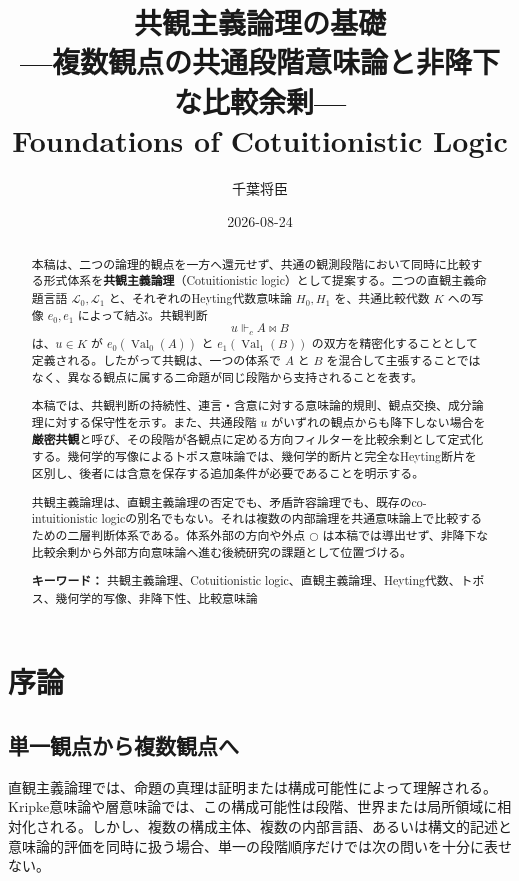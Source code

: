 \documentclass[a4paper,11pt]{ltjsarticle}
\title{共観主義論理の基礎\\[0.2em]
  {\Large ---複数観点の共通段階意味論と非降下な比較余剰---}\\[0.4em]
  {\large Foundations of Cotuitionistic Logic}}
\author{千葉将臣}
\date{2026-08-24}
\theoremstyle{definition}
\theoremstyle{plain}
\newcommand{\Val}{\operatorname{Val}}
\newcommand{\dfix}{\bigcirc}
\newcommand{\forcesc}{\Vdash_{\!c}}
\begin{document}
\maketitle

\begin{abstract}
本稿は、二つの論理的観点を一方へ還元せず、共通の観測段階において同時に比較する形式体系を\textbf{共観主義論理}（Cotuitionistic logic）として提案する。二つの直観主義命題言語 $\mathcal L_0,\mathcal L_1$ と、それぞれのHeyting代数意味論 $H_0,H_1$ を、共通比較代数 $K$ への写像 $e_0,e_1$ によって結ぶ。共観判断
\[
 u\forcesc A\bowtie B
\]
は、$u\in K$ が $e_0(\Val_0(A))$ と $e_1(\Val_1(B))$ の双方を精密化することとして定義される。したがって共観は、一つの体系で $A$ と $B$ を混合して主張することではなく、異なる観点に属する二命題が同じ段階から支持されることを表す。

本稿では、共観判断の持続性、連言・含意に対する意味論的規則、観点交換、成分論理に対する保守性を示す。また、共通段階 $u$ がいずれの観点からも降下しない場合を\textbf{厳密共観}と呼び、その段階が各観点に定める方向フィルターを比較余剰として定式化する。幾何学的写像によるトポス意味論では、幾何学的断片と完全なHeyting断片を区別し、後者には含意を保存する追加条件が必要であることを明示する。

共観主義論理は、直観主義論理の否定でも、矛盾許容論理でも、既存のco-intuitionistic logicの別名でもない。それは複数の内部論理を共通意味論上で比較するための二層判断体系である。体系外部の方向や外点 $\dfix$ は本稿では導出せず、非降下な比較余剰から外部方向意味論へ進む後続研究の課題として位置づける。

\medskip
\noindent\textbf{キーワード：} 共観主義論理、Cotuitionistic logic、直観主義論理、Heyting代数、トポス、幾何学的写像、非降下性、比較意味論
\end{abstract}

\tableofcontents

\section{序論}

\subsection{単一観点から複数観点へ}

直観主義論理では、命題の真理は証明または構成可能性によって理解される。Kripke意味論や層意味論では、この構成可能性は段階、世界または局所領域に相対化される\cite{Kripke1965,FourmanScott1979,johnstone}。しかし、複数の構成主体、複数の内部言語、あるいは構文的記述と意味論的評価を同時に扱う場合、単一の段階順序だけでは次の問いを十分に表せない。
\end{document}

